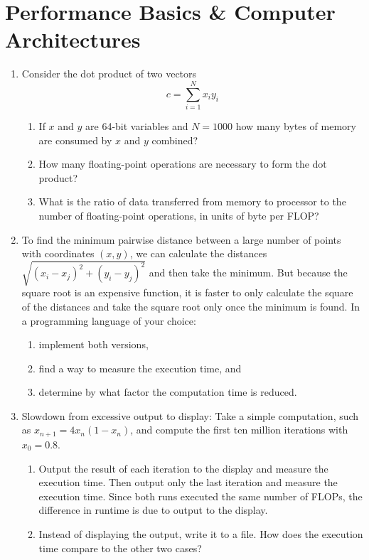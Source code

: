 \documentclass{article}
\begin{document}
\section{Performance Basics \& Computer Architectures}
\begin{enumerate}
\item  
Consider the dot product of two vectors
\[
c = \sum_{i=1}^N x_i y_i
\]
\begin{enumerate} \setlength{\itemsep}{0pt}
\item If $x$ and $y$ are 64-bit variables and $N=1000$ how many bytes of memory are consumed by $x$ and $y$ combined?
\item How many floating-point operations are necessary to form the dot product?
\item What is the ratio of data transferred from memory to processor to the number of floating-point operations, in units of byte per FLOP?
\end{enumerate}


\item
To find the minimum pairwise distance between a large number of points with coordinates $(x,y)$, we can calculate the distances $\sqrt{(x_i-x_j)^2 + (y_i-y_j)^2}$ and then take the minimum. But because the square root is an expensive function, it is faster to only calculate the square of the distances and take the square root only once the minimum is found.
In a programming language of your choice:
\begin{enumerate} \setlength{\itemsep}{0pt}
\item implement both versions,
\item find a way to measure the execution time, and
\item determine by what factor the computation time is reduced. 
\end{enumerate}


\item \label{prbl:slowdisplay}
Slowdown from excessive output to display:
Take a simple computation, such as $x_{n+1} = 4 x_n (1-x_n)$, and compute the first ten million iterations with $x_0=0.8$.
\vspace{-1em}\begin{enumerate} \setlength{\itemsep}{0pt}
\item Output the result of each iteration to the display and measure the execution time. Then output only the last iteration and measure the execution time. Since both runs executed the same number of FLOPs, the difference in runtime is due to output to the display.
\item Instead of displaying the output, write it to a file.
  How does the execution time compare to the other two cases?
\end{enumerate}



\end{enumerate}
\end{document}
